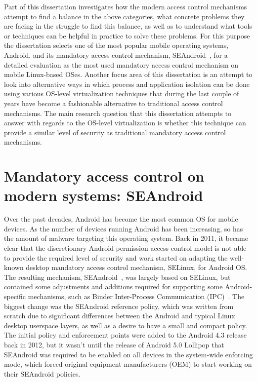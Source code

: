 Part of this dissertation investigates how the modern access control mechanisms attempt to find a balance in the above categories, what concrete problems they are facing in the struggle to find this balance, as well as to understand what tools or techniques can be helpful in practice to solve these problems. For this purpose the dissertation selects one of the most popular mobile operating systems, Android, and its mandatory access control mechanism, SEAndroid~\cite{smalley12}, for a detailed evaluation as the most used mandatory access control mechanism on mobile Linux-based OSes. Another focus area of this dissertation is an attempt to look into alternative ways in which process and application isolation can be done using various OS-level virtualization  techniques that during the last couple of years have become a fashionable alternative to traditional access control mechanisms. The main research question that this dissertation attempts to answer with regards to the OS-level virtualization is whether this technique can provide a similar level of security as traditional mandatory access control mechanisms. 


\section{Mandatory access control on modern systems: SEAndroid}

Over the past decades, Android has become the most common OS for mobile devices. As the number of devices running Android has been increasing, so has the amount of malware targeting this operating system. Back in 2011, it became clear that the discretionary Android permission access control model is not able to provide the required level of security and work started on adapting the well-known desktop mandatory access control mechanism, SELinux, for Android OS. The resulting mechanism, SEAndroid~\cite{smalley12}, was largely based on SELinux, but contained some adjustments and additions required for supporting some Android-specific mechanisms, such as Binder Inter-Process Communication (IPC)~\cite{binder}. The biggest change was the SEAndroid reference policy, which was written from scratch due to significant differences between the Android and typical Linux desktop userspace layers, as well as a desire to have a small and compact policy. The initial policy and enforcement points were added to the Android 4.3 release back in 2012, but it wasn't until the release of Android 5.0 Lollipop that SEAndroid was required to be enabled on all devices in the system-wide enforcing mode, which forced original equipment manufacturers (OEM) to start working on their SEAndroid policies. 


